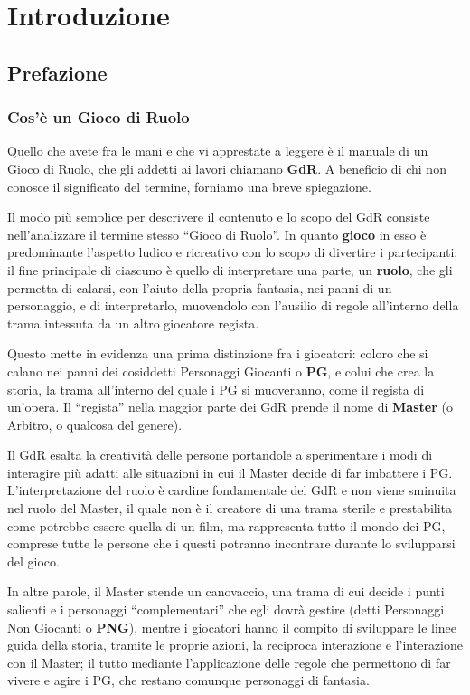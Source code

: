 %
\chapter{Introduzione}
\section{Prefazione}
\subsection{Cos'\`e un Gioco di Ruolo}
Quello che avete fra le mani e che vi apprestate a leggere \`e il
manuale di un Gioco di Ruolo, che gli addetti ai lavori chiamano {\bf
GdR}. A beneficio di chi non conosce il significato del termine,
forniamo una breve spiegazione.

Il modo pi\`u semplice per descrivere il contenuto e lo scopo del
GdR consiste nell'analizzare il termine stesso ``Gioco di Ruolo''. In
quanto {\bf gioco} in esso \`e predominante l'aspetto ludico e ricreativo
con lo scopo di divertire i partecipanti; il fine principale di ciascuno \`e
quello di interpretare una parte, un {\bf ruolo}, che gli permetta
di calarsi, con l'aiuto della propria fantasia, nei panni di un
personaggio, e di interpretarlo, muovendolo con l'ausilio di regole
all'interno della trama intessuta da un altro giocatore regista.
\iffullversion

Questo mette in evidenza una prima distinzione fra i giocatori:
coloro che si calano nei panni dei cosiddetti Personaggi Giocanti o
{\bf PG}, e colui che crea la storia, la trama all'interno del quale i PG si
muoveranno, come il regista di un'opera. Il ``regista'' nella
maggior parte dei GdR prende il nome di {\bf Master} (o Arbitro, o qualcosa
del genere).

Il GdR esalta la creativit\`a delle persone portandole a
sperimentare i modi di interagire pi\`u adatti alle situazioni in
cui il Master decide di far imbattere i PG. L'interpretazione del
ruolo \`e cardine fondamentale del GdR e non viene sminuita nel
ruolo del Master, il quale non \`e il creatore di una trama sterile
e prestabilita come potrebbe essere quella di un film, ma rappresenta
tutto il mondo dei PG, comprese tutte le persone che i questi potranno
incontrare durante lo svilupparsi del gioco. 

In altre parole, il
Master stende un canovaccio, una trama di cui decide i punti salienti
e i personaggi ``complementari'' che egli dovr\`a gestire (detti
Personaggi Non Giocanti o {\bf PNG}), mentre i giocatori hanno il compito di
sviluppare le linee guida della storia, tramite le proprie azioni, la
reciproca interazione e l'interazione con il Master; il tutto mediante
l'applicazione delle regole che permettono di far vivere e agire i PG,
che restano comunque personaggi di fantasia.
\fi


